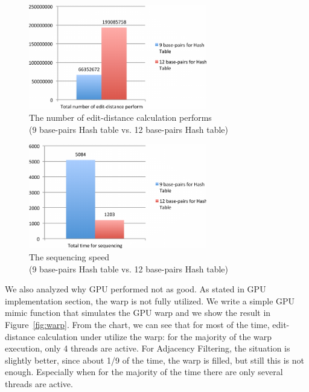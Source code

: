 \begin{figure}[h] \centering
\vspace{0.1in}
\includegraphics[height=1.8in]{./figure/C0912_ED_B.pdf} \vspace{0in}
\caption{The number of edit-distance calculation performs \\ 
		(9 base-pairs Hash table vs. 12 base-pairs Hash table)}
\label{fig:c0912_ed} \end{figure}

\begin{figure}[h] \centering
\vspace{0.1in}
\includegraphics[height=1.8in]{./figure/C0912_Speed_B.pdf} \vspace{0in}
\caption{The sequencing speed \\ 
		(9 base-pairs Hash table vs. 12 base-pairs Hash table)}
\label{fig:c0912_speed} \end{figure}

We also analyzed why GPU performed not as good. As stated in GPU implementation
section, the warp is not fully utilized. We write a simple GPU mimic function
that simulates the GPU warp and we show the result in Figure~\ref{fig:warp}. From the chart,
we can see that for most of the time, edit-distance calculation under utilize
the warp: for the majority of the warp execution, only 4 threads are active.
For Adjacency Filtering, the situation is slightly better, since about 1/9 of
the time, the warp is filled, but still this is not enough. Especially when for
the majority of the time there are only several threads are active.\\

